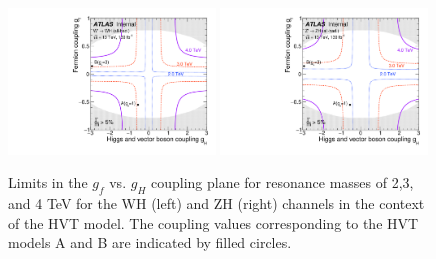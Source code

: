 \begin{figure}[htbp!]
    \begin{center}
        \includegraphics[width=0.49\textwidth]{HVT_coupling_WH.pdf}
        \includegraphics[width=0.49\textwidth]{HVT_coupling_ZH.pdf}
    \end{center}
    \caption{
        Limits in the $g_f$ vs. $g_H$ coupling plane for resonance masses of 2,3, and 4 TeV for the WH (left) and ZH (right) channels in the context of the HVT model.
        The coupling values corresponding to the HVT models A and B are indicated by filled circles.
    }
    \label{fig:hvt_coupling_plane}
\end{figure}

